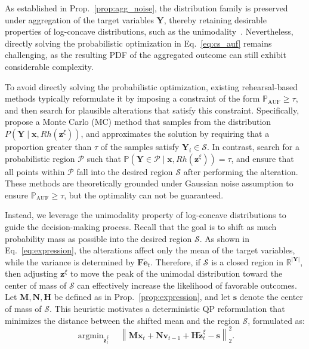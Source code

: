 \documentclass{article}
\theoremstyle{plain}
\theoremstyle{definition}
\theoremstyle{remark}
\def \Eq {Eq.}
\def \prop {Prop.}
\def \x {\mathbf{x}}
\def \sP {\mathcal{P}}
\def \N {\mathbf{N}}
\def \sS {\mathcal{S}}
\def \Y {\mathbf{Y}}
\def \s {\mathbf{s}}
\def \M {\mathbf{M}}
\def \H {\mathbf{H}}
\def \F {\mathbf{F}}
\def \e {\mathbf{e}}
\def \v {\mathbf{v}}
\def \z {\mathbf{z}}
\begin{document}
As established in \prop~\ref{prop:agg_noise}, the distribution family is preserved under aggregation of the target variables \(\Y\), thereby retaining desirable properties of log-concave distributions, such as the unimodality~\citep{dharmadhikari1988unimodality}.  
Nevertheless, directly solving the probabilistic optimization in \Eq~\eqref{eq:cs_auf} remains challenging, as the resulting PDF of the aggregated outcome can still exhibit considerable complexity.

To avoid directly solving the probabilistic optimization, existing rehearsal-based methods typically reformulate it by imposing a constraint of the form \(\mathbb{P}_{\operatorname{AUF}} \geq \tau\), and then search for plausible alterations that satisfy this constraint. 
Specifically, \citet{qint2023srm} propose a Monte Carlo (MC) method that samples from the distribution \(P(\Y \mid \x, Rh(\z^\xi))\), and approximates the solution by requiring that a proportion greater than \(\tau\) of the samples satisfy \(\Y_i \in \sS\). 
In contrast, \citet{du2024micns} search for a probabilistic region \(\sP\) such that \(\mathbb{P}(\Y \in \sP \mid \x, Rh(\z^\xi)) = \tau\), and ensure that all points within \(\sP\) fall into the desired region \(\sS\) after performing the alteration. 
These methods are theoretically grounded under Gaussian noise assumption to ensure \(\mathbb{P}_{\operatorname{AUF}} \geq \tau\), but the optimality can not be guaranteed. 

Instead, we leverage the unimodality property of log-concave distributions to guide the decision-making process. 
Recall that the goal is to shift as much probability mass as possible into the desired region \(\sS\). 
As shown in \Eq~\eqref{eq:expression}, the alterations affect only the mean of the target variables, while the variance is determined by \(\F\tilde{\e}_t\). 
Therefore, if \(\sS\) is a closed region in \(\mathbb{R}^{|\Y|}\), then adjusting \(\z^\xi\) to move the peak of the unimodal distribution toward the center of mass of \(\sS\) can effectively increase the likelihood of favorable outcomes. 
Let \(\M, \N, \H\) be defined as in \prop~\ref{prop:expression}, and let \(\s\) denote the center of mass of \(\sS\). 
This heuristic motivates a deterministic QP reformulation that minimizes the distance between the shifted mean and the region \(\sS\), formulated as:
  \begin{equation}
    \label{eq:cs_auf_trans}
    \mathop{\arg\min}_{\tilde{\z}_t^\xi}\quad \left\|\M\x_t + \N\v_{t-1} + \H\tilde{\z}_t^\xi - \s\right\|_2^2. 
  \end{equation}
  \vskip -0.1in
\end{document}
